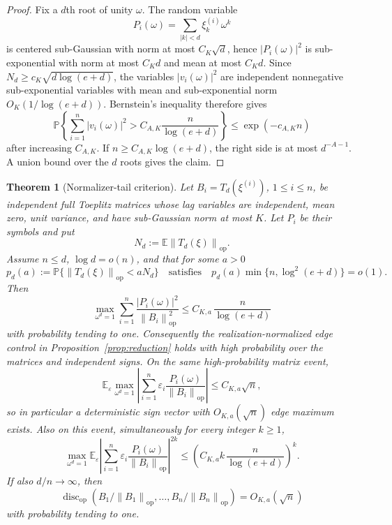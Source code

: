 \documentclass[11pt]{amsart}
\numberwithin{equation}{section}
\newtheorem{theorem}{Theorem}[section]
\theoremstyle{definition}
\theoremstyle{remark}
\newcommand{\op}{\mathrm{op}}
\newcommand{\discop}{\operatorname{disc}_{\op}}
\newcommand{\Prob}{\mathbb P}
\newcommand{\Exp}{\mathbb E}
\newcommand{\norm}[1]{\left\lVert #1\right\rVert}
\newcommand{\abs}[1]{\left\lvert #1\right\rvert}
\newcommand{\eps}{\varepsilon}
\begin{document}
\begin{proof}
Fix a \(d\)th root of unity \(\omega\).  The random variable
\[
  P_i(\omega)=\sum_{\abs{k}<d}\xi_k^{(i)}\omega^k
\]
is centered sub-Gaussian with norm at most \(C_K\sqrt d\), hence
\(\abs{P_i(\omega)}^2\) is sub-exponential with norm at most \(C_K d\) and mean
at most \(C_K d\).  Since \(N_d\ge c_K\sqrt{d\log(e+d)}\), the variables
\(\abs{v_i(\omega)}^2\) are independent nonnegative sub-exponential variables
with mean and sub-exponential norm \(O_K(1/\log(e+d))\). Bernstein's inequality
therefore gives
\[
  \Prob\left\{
    \sum_{i=1}^n\abs{v_i(\omega)}^2
    > C_{A,K}\frac{n}{\log(e+d)}
  \right\}\le \exp(-c_{A,K}n)
\]
after increasing \(C_{A,K}\).  If \(n\ge C_{A,K}\log(e+d)\), the right side is
at most \(d^{-A-1}\).  A union bound over the \(d\) roots gives the claim.
\end{proof}

\begin{theorem}[Normalizer-tail criterion]\label{thm:normalizer-tail}
Let \(B_i=T_d(\xi^{(i)})\), \(1\le i\le n\), be independent full Toeplitz
matrices whose lag variables are independent, mean zero, unit variance, and have
sub-Gaussian norm at most \(K\).  Let \(P_i\) be their symbols and put
\[
  N_d:=\Exp\norm{T_d(\xi)}_{\op}.
\]
Assume \(n\le d\), \(\log d=o(n)\), and that for some \(a>0\)
\[
  p_d(a):=\Prob\{\norm{T_d(\xi)}_{\op}<aN_d\}
  \quad\text{satisfies}\quad
  p_d(a)\min\{n,\log^2(e+d)\}=o(1).
\]
Then
\[
  \max_{\omega^d=1}
  \sum_{i=1}^n
  \frac{\abs{P_i(\omega)}^2}{\norm{B_i}_{\op}^2}
  \le C_{K,a}\,\frac{n}{\log(e+d)}
\]
with probability tending to one.  Consequently the realization-normalized edge
control in Proposition~\ref{prop:reduction} holds with high probability over
the matrices and independent signs.  On the same high-probability matrix event,
\[
  \Exp_\eps\max_{\omega^d=1}\left|\sum_{i=1}^n
  \eps_i\frac{P_i(\omega)}{\norm{B_i}_{\op}}\right|
  \le C_{K,a}\sqrt n,
\]
so in particular a deterministic sign vector with \(O_{K,a}(\sqrt n)\) edge
maximum exists.  Also on this event, simultaneously for every integer \(k\ge1\),
\[
  \max_{\omega^d=1}
  \Exp_\eps\left|\sum_{i=1}^n
  \eps_i\frac{P_i(\omega)}{\norm{B_i}_{\op}}\right|^{2k}
  \le
  \left(C_{K,a}k\,\frac n{\log(e+d)}\right)^k .
\]
If also \(d/n\to\infty\), then
\[
  \discop(B_1/\norm{B_1}_{\op},\ldots,B_n/\norm{B_n}_{\op})
  =O_{K,a}(\sqrt n)
\]
with probability tending to one.
\end{theorem}
\end{document}
